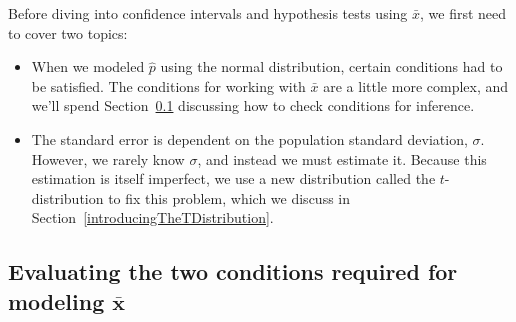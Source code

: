 \noindent%
Before diving into confidence intervals and hypothesis
tests using $\bar{x}$, we first need to cover two topics:
\begin{itemize}
\item
    When we modeled $\hat{p}$ using the normal distribution,
    certain conditions had to be satisfied.
    The conditions for working with $\bar{x}$
    are a little more complex, and we'll spend
    Section~\ref{x_bar_conditions} discussing
    how to check conditions for inference.
\item
    The standard error is dependent on the population
    standard deviation, $\sigma$.
    However, we rarely know $\sigma$, and instead
    we must estimate it.
    Because this estimation is itself imperfect,
    we use a new distribution called the
    $t$-distribution
    to fix this problem, which we discuss in
    Section~\ref{introducingTheTDistribution}.
\end{itemize}


\subsection[Evaluating the two conditions required for
    modeling $\bar{x}$]
  {Evaluating the two conditions required for
      modeling $\mathbf{\bar{x}}$}
\label{x_bar_conditions}

